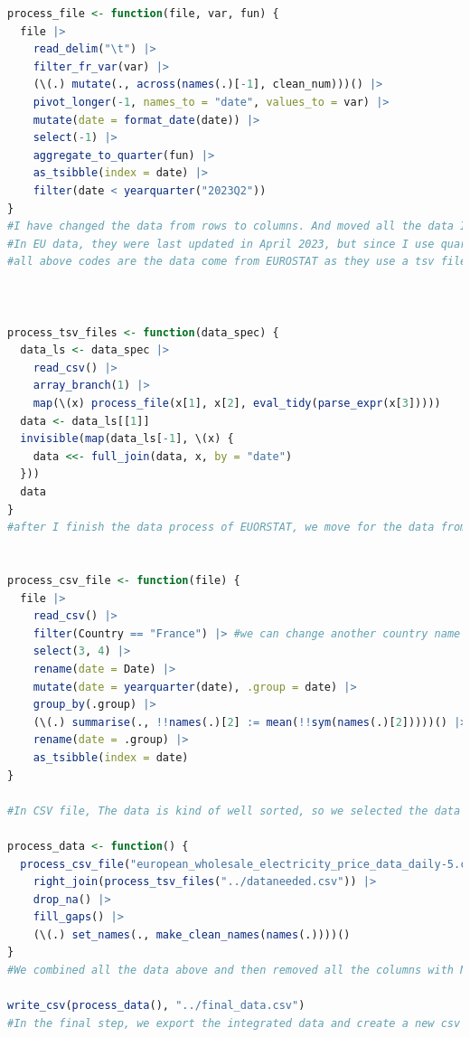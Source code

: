 \documentclass[12pt]{article}
\begin{document}
\begin{lstlisting}[language=R]
process_file <- function(file, var, fun) {
  file |>
    read_delim("\t") |>
    filter_fr_var(var) |>
    (\(.) mutate(., across(names(.)[-1], clean_num)))() |>
    pivot_longer(-1, names_to = "date", values_to = var) |>
    mutate(date = format_date(date)) |>
    select(-1) |>
    aggregate_to_quarter(fun) |>
    as_tsibble(index = date) |>
    filter(date < yearquarter("2023Q2"))
}
#I have changed the data from rows to columns. And moved all the data I needed variable name to the first row (these are the column coordinates in EUROSTAT's data)
#In EU data, they were last updated in April 2023, but since I use quarterly data, I removed the second quarter of 2023.
#all above codes are the data come from EUROSTAT as they use a tsv file. 



process_tsv_files <- function(data_spec) {
  data_ls <- data_spec |>
    read_csv() |>
    array_branch(1) |>
    map(\(x) process_file(x[1], x[2], eval_tidy(parse_expr(x[3]))))
  data <- data_ls[[1]]
  invisible(map(data_ls[-1], \(x) {
    data <<- full_join(data, x, by = "date")
  }))
  data
}
#after I finish the data process of EUORSTAT, we move for the data from EMBER. (electricity price for EU.) the data is a csv file.


process_csv_file <- function(file) {
  file |>
    read_csv() |>
    filter(Country == "France") |> #we can change another country name if you want another country data
    select(3, 4) |>
    rename(date = Date) |>
    mutate(date = yearquarter(date), .group = date) |>
    group_by(.group) |>
    (\(.) summarise(., !!names(.)[2] := mean(!!sym(names(.)[2]))))() |>
    rename(date = .group) |>
    as_tsibble(index = date)
}

#In CSV file, The data is kind of well sorted, so we selected the data with France ourselves. However, this data is daily data and I need to change it to quarterly data. I calculated the quarterly mean price and merged it with the above processed file in the same format.

process_data <- function() {
  process_csv_file("european_wholesale_electricity_price_data_daily-5.csv") |>
    right_join(process_tsv_files("../dataneeded.csv")) |>
    drop_na() |>
    fill_gaps() |>
    (\(.) set_names(., make_clean_names(names(.))))()
}
#We combined all the data above and then removed all the columns with NA, as the data was not collected at the same time for different files, and we ended up with perfect data from the first quarter of 2015 to the first quarter of 2023.

write_csv(process_data(), "../final_data.csv")
#In the final step, we export the integrated data and create a new csv file

\end{lstlisting}
\end{document}
